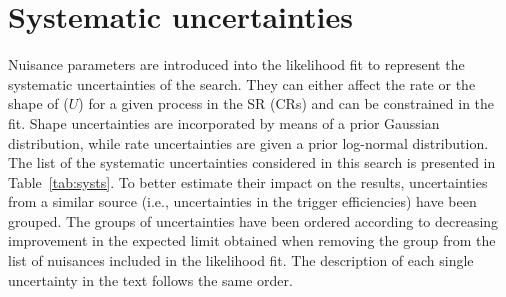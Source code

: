 \section{Systematic uncertainties}

Nuisance parameters are introduced into the likelihood fit to represent the systematic uncertainties of the search. They can either affect the rate or  the shape of \ptmiss ($U$) for a given process in the SR (CRs) and can be constrained in the fit. Shape uncertainties are incorporated by means of a prior Gaussian distribution, while rate uncertainties are given a prior log-normal distribution. The list of the systematic uncertainties considered in this search is presented in Table~\ref{tab:systs}. To better estimate their impact on the results, uncertainties from a similar source (i.e., uncertainties in the trigger efficiencies) have been grouped. The groups of uncertainties have been ordered according to decreasing improvement in the expected limit obtained when removing the group from the list of nuisances included in the likelihood fit. The description of each single uncertainty in the text follows the same order.

